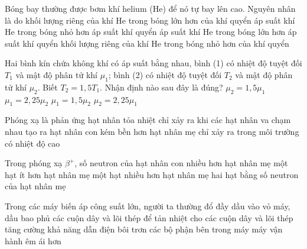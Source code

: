 	\begin{ex}%
		Bóng bay thường được bơm khí helium (He) để nó tự bay lên cao. Nguyên nhân là do
		\choice
		{khối lượng riêng của khí He trong bóng lớn hơn của khí quyển}
		{áp suất khí He trong bóng nhỏ hơn áp suất khí quyển}
		{áp suất khí He trong bóng lớn hơn áp suất khí quyển}
		{\True khối lượng riêng của khí He trong bóng nhỏ hơn của khí quyển}
	\end{ex}

	\begin{ex}%
		Hai bình kín chứa không khí có áp suất bằng nhau, bình (1) có nhiệt độ tuyệt đối $T_1$ và mật độ phân tử khí $\mu_1$; bình (2) có nhiệt độ tuyệt đối $T_2$ và mật độ phân tử khí $\mu_2$. Biết $T_2=1{,}5T_1$. Nhận định nào sau đây là đúng?
		\choice
		{$\mu_2=1{,}5\mu_1$}
		{$\mu_1=2{,}25\mu_2$}
		{\True $\mu_1=1{,}5\mu_2$}
		{$\mu_2=2{,}25\mu_1$}
	\end{ex}

	\begin{ex}%
		Phóng xạ
		\choice
		{\True là phản ứng hạt nhân tỏa nhiệt}
		{chỉ xảy ra khi các hạt nhân va chạm nhau}
		{tạo ra hạt nhân con kém bền hơn hạt nhân mẹ}
		{chỉ xảy ra trong môi trường có nhiệt độ cao}
	\end{ex}

	\begin{ex}%
		Trong phóng xạ $\beta^{+}$, số neutron của hạt nhân con
		\choice
		{\True nhiều hơn hạt nhân mẹ một hạt}
		{ít hơn hạt nhân mẹ một hạt}
		{nhiều hơn hạt nhân mẹ hai hạt}
		{bằng số neutron của hạt nhân mẹ}
	\end{ex}

	\begin{ex}%
		Trong các máy biến áp công suất lớn, người ta thường đổ đầy dầu vào vỏ máy, dầu bao phủ các cuộn dây và lõi thép để
		\choice
		{\True tản nhiệt cho các cuộn dây và lõi thép}
		{tăng cường khả năng dẫn điện}
		{bôi trơn các bộ phận bên trong máy}
		{máy vận hành êm ái hơn}
	\end{ex}

